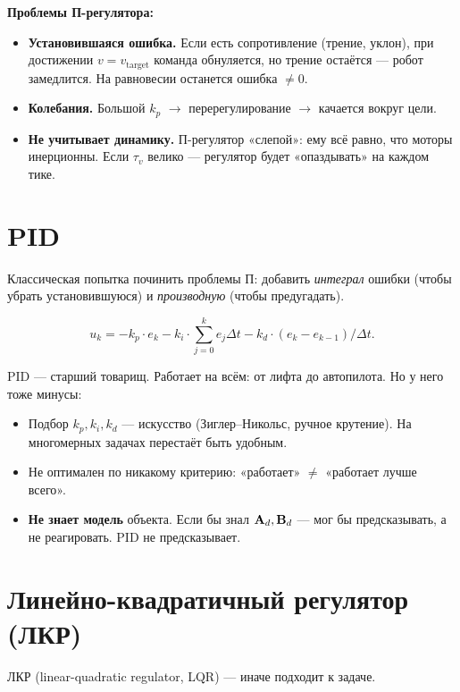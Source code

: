 \textbf{Проблемы П-регулятора:}

\begin{itemize}
  \item \textbf{Установившаяся ошибка.} Если есть сопротивление (трение,
        уклон), при достижении $v = v_\text{target}$ команда обнуляется,
        но трение остаётся --- робот замедлится. На равновесии останется
        ошибка $\ne 0$.
  \item \textbf{Колебания.} Большой $k_p$ $\to$ перерегулирование $\to$
        качается вокруг цели.
  \item \textbf{Не учитывает динамику.} П-регулятор «слепой»: ему всё равно,
        что моторы инерционны. Если $\tau_v$ велико --- регулятор
        будет «опаздывать» на каждом тике.
\end{itemize}

\section{PID}

Классическая попытка починить проблемы П: добавить \emph{интеграл} ошибки
(чтобы убрать установившуюся) и \emph{производную} (чтобы предугадать).

\begin{equation}
  u_k = -k_p \cdot e_k - k_i \cdot \sum_{j=0}^{k} e_j \Delta t - k_d \cdot (e_k - e_{k-1})/\Delta t.
  \label{eq:PID_controller}
\end{equation}

PID --- старший товарищ. Работает на всём: от лифта до автопилота. Но
у него тоже минусы:

\begin{itemize}
  \item Подбор $k_p, k_i, k_d$ --- искусство (Зиглер--Никольс, ручное
        крутение). На многомерных задачах перестаёт быть удобным.
  \item Не оптимален по никакому критерию: «работает» $\ne$ «работает
        лучше всего».
  \item \textbf{Не знает модель} объекта. Если бы знал $\mathbf{A}_d, \mathbf{B}_d$
        --- мог бы предсказывать, а не реагировать. PID не предсказывает.
\end{itemize}

\section{Линейно-квадратичный регулятор (ЛКР)}

ЛКР (linear-quadratic regulator, LQR) --- иначе подходит к задаче.

